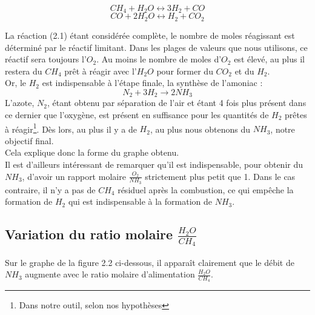 \documentclass[12pt]{report}
\begin{document}
 \begin{equation}
 CH_4 + H_2O \leftrightarrow 3H_2 + CO
 \end{equation}
 \begin{equation}
 CO + 2H_2O \leftrightarrow H_2 + CO_2
 \end{equation}

La réaction (2.1) étant considérée complète, le nombre de moles réagissant est déterminé par le réactif limitant. Dans les plages de valeurs que nous utilisons, ce réactif sera toujours l'$O_2$. Au moins le nombre de moles d'$O_2$ est élevé, au plus il restera du $CH_4$ prêt à réagir avec l'$H_2O$ pour former du $CO_2$ et du $H_2$.\\

Or, le $H_2$ est indispensable à l'étape finale, la synthèse de l'amoniac : 
\begin{equation}
N_2 + 3H_2 \rightarrow 2NH_3
\end{equation}
L'azote, $N_2$, étant obtenu par séparation de l'air et étant 4 fois plus présent dans ce dernier que l'oxygène, est présent en suffisance pour les quantités de $H_2$ prêtes à réagir\footnote{Dans notre outil, selon nos hypothèses}. Dès lors, au plus il y a de $H_2$, au plus nous obtenons du $NH_3$, notre objectif final.\\

Cela explique donc la forme du graphe obtenu.\\

Il est d'ailleurs intéressant de remarquer qu'il est indispensable, pour obtenir du $NH_3$, d'avoir un rapport molaire $\frac{O_2}{NH_3}$ strictement plus petit que 1. Dans le cas contraire, il n'y a pas de $CH_4$ résiduel après la combustion, ce qui empêche la formation de $H_2$ qui est indispensable à la formation de $NH_3$.

\subsection{Variation du ratio molaire $\frac{H_2O}{CH_4}$}

Sur le graphe de la figure 2.2 ci-dessous, il apparaît clairement que le débit de $NH_3$ augmente avec le ratio molaire d'alimentation $\frac{H_2O}{CH_4}$.\\
\end{document}
